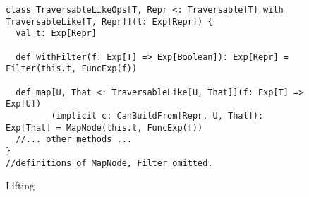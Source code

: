 \begin{figure}
\begin{center}
\begin{lstlisting}
class TraversableLikeOps[T, Repr <: Traversable[T] with TraversableLike[T, Repr]](t: Exp[Repr]) {
  val t: Exp[Repr]

  def withFilter(f: Exp[T] => Exp[Boolean]): Exp[Repr] = Filter(this.t, FuncExp(f))

  def map[U, That <: TraversableLike[U, That]](f: Exp[T] => Exp[U])
         (implicit c: CanBuildFrom[Repr, U, That]): Exp[That] = MapNode(this.t, FuncExp(f))
  //... other methods ...
}
//definitions of MapNode, Filter omitted.
\end{lstlisting}
\end{center}
\caption{Lifting }
\label{fig:liftTrav}
\end{figure}

